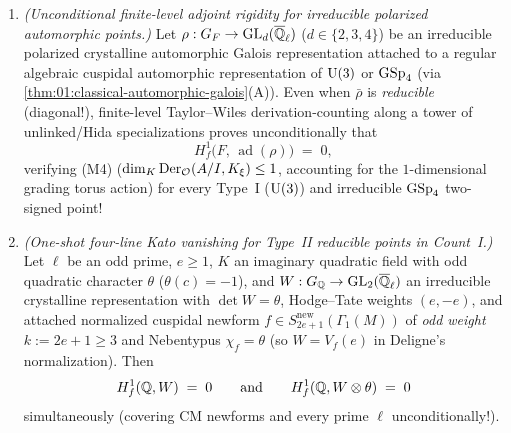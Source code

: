 
\begin{theorem}
\label{thm:20:graded-length}
\leavevmode
\begin{enumerate}[label=\textup{(\roman*)}]
\item \emph{(Unconditional finite-level adjoint rigidity for irreducible polarized automorphic points.)} Let $\rho : G_F \to \mathrm{GL}_d(\overline{\mathbb{Q}}_\ell)$ ($d \in \{2, 3, 4\}$) be an irreducible polarized crystalline automorphic Galois representation attached to a regular algebraic cuspidal automorphic representation of $\mathrm{U}(3)$ or $\mathrm{GSp}_4$ (via \cref{thm:01:classical-automorphic-galois}(A)). Even when $\bar{\rho}$ is \emph{reducible} (diagonal!), finite-level Taylor--Wiles derivation-counting along a tower of unlinked/Hida specializations proves unconditionally that
  \[
    H^1_f\bigl(F,\, \operatorname{ad}(\rho)\bigr) \;=\; 0,
  \]
  verifying \textup{(M4)} ($\dim_K \operatorname{Der}_{\mathcal{O}}(A/I, K_\xi) \le 1$, accounting for the $1$-dimensional grading torus action) for every Type~I ($\mathrm{U}(3)$) and irreducible $\mathrm{GSp}_4$ two-signed point!
\item \emph{(One-shot four-line Kato vanishing for Type~II reducible points in Count~I.)} Let $\ell$ be an odd prime, $e \ge 1$, $K$ an imaginary quadratic field with odd quadratic character $\theta$ ($\theta(c) = -1$), and $W : G_{\mathbb{Q}} \to \mathrm{GL}_2(\overline{\mathbb{Q}}_\ell)$ an irreducible crystalline representation with $\det W = \theta$, Hodge--Tate weights $(e, -e)$, and attached normalized cuspidal newform $f \in S_{2e+1}^{\mathrm{new}}(\Gamma_1(M))$ of \emph{odd weight} $k := 2e + 1 \ge 3$ and Nebentypus $\chi_f = \theta$ (so $W = V_f(e)$ in Deligne's normalization). Then
  \begin{equation}
  \label{eq:20:kato-oneshot}
    H^1_f(\mathbb{Q}, W) \;=\; 0 \qquad\text{and}\qquad H^1_f(\mathbb{Q}, W \otimes \theta) \;=\; 0
  \end{equation}
  simultaneously (covering CM newforms and every prime $\ell$ unconditionally!).
\end{enumerate}
\end{theorem}

